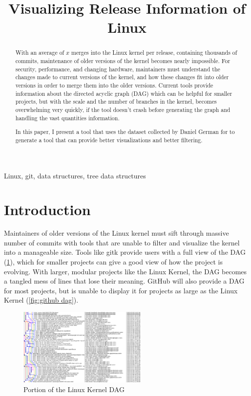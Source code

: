 \documentclass[conference, draftclsnofoot]{IEEEtran}
\makeatletter
\newcommand{\TheTitle}{Visualizing Release Information of Linux}
\newcommand{\TheAuthors}{Evan Wilde}
\newcommand{\TheEmails}{etcwilde@uvic.ca}
\newcommand{\TheKeywords}{Linux, git, data structures, tree data structures}
\makeatother
\begin{document}
\title{\TheTitle}
\author{
\IEEEauthorblockA{\TheAuthors}
\IEEEauthorblockA{Email: \TheEmails}
}
\maketitle
\begin{abstract}

With an average of $x$  merges into the Linux
kernel per release, containing thousands of commits, maintenance of older
versions of the kernel becomes nearly impossible. For security, performance,
and changing hardware, maintainers must understand the changes made to current
versions of the kernel, and how these changes fit into older versions in order
to merge them into the older versions. Current tools provide information about
the directed acyclic graph (DAG)
which can be helpful for smaller projects, but with the scale and the number of
branches in the kernel, becomes overwhelming very quickly, if the tool doesn't
crash before generating the graph and handling the vast quantities information.

In this paper, I present a tool that uses the dataset collected by Daniel
German for  to generate a tool that can provide
better visualizations and better filtering.
\end{abstract}
\begin{IEEEkeywords}
\TheKeywords
\end{IEEEkeywords}

\section{Introduction}

Maintainers of older versions of the Linux kernel must sift through massive
number of commits with tools that are unable to filter and visualize the kernel
into a manageable size. Tools like gitk provide users with a full
view of the DAG (\ref{fig:DAG}), which for smaller projects can give a good
view of how the project is evolving. With larger, modular projects like the
Linux Kernel, the DAG becomes a tangled mess of lines that lose their meaning.
GitHub will also provide a DAG for most projects, but is unable to display it
for projects as large as the Linux Kernel (\ref{fig:github dag}).

\begin{figure}[h]
	\centering
	\includegraphics[height=1.5in]{figures/gitk.png}
	\caption{Portion of the Linux Kernel DAG}
	\label{fig:DAG}
\end{figure}
\end{document}
